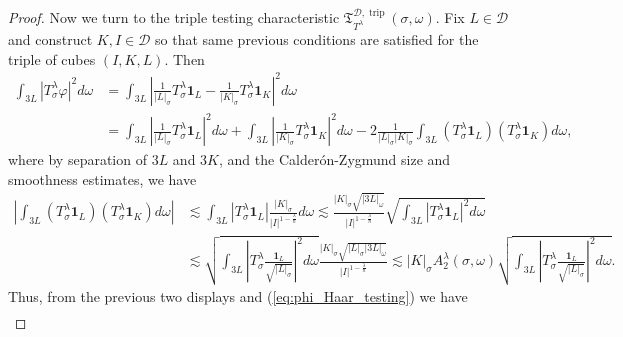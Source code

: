 \documentclass{amsart}%
\theoremstyle{plain}
\numberwithin{equation}{section}
\begin{document}
\begin{proof}
Now we turn to the triple testing characteristic $\mathfrak{T}_{T^{\lambda}%
}^{\mathcal{D},\operatorname*{trip}}\left(  \sigma,\omega\right)  $. Fix
$L\in\mathcal{D}$ and construct $K,I\in\mathcal{D}$ so that same previous conditions are satisfied for the triple of cubes $\left(  I,K,L\right)  $. Then 
\begin{align*}
\int_{3L}\left\vert T_{\sigma}^{\lambda}\varphi\right\vert ^{2}d\omega &
=\int_{3L}\left\vert \frac{1}{\left\vert L\right\vert _{\sigma}}T_{\sigma
}^{\lambda}\mathbf{1}_{L}-\frac{1}{\left\vert K\right\vert _{\sigma}}%
T_{\sigma}^{\lambda}\mathbf{1}_{K}\right\vert ^{2}d\omega\\
&  =\int_{3L}\left\vert \frac{1}{\left\vert L\right\vert _{\sigma}}T_{\sigma
}^{\lambda}\mathbf{1}_{L}\right\vert ^{2}d\omega+\int_{3L}\left\vert \frac
{1}{\left\vert K\right\vert _{\sigma}}T_{\sigma}^{\lambda}\mathbf{1}%
_{K}\right\vert ^{2}d\omega-2\frac{1}{\left\vert L\right\vert _{\sigma
}\left\vert K\right\vert _{\sigma}}\int_{3L}\left(  T_{\sigma}^{\lambda
}\mathbf{1}_{L}\right)  \left(  T_{\sigma}^{\lambda}\mathbf{1}_{K}\right)
d\omega,
\end{align*}
where by separation of $3L$ and $3K$, and the Calder\'{o}n-Zygmund size and
smoothness estimates, we have%
\begin{align*}
\left\vert \int_{3L}\left(  T_{\sigma}^{\lambda}\mathbf{1}_{L}\right)  \left(
T_{\sigma}^{\lambda}\mathbf{1}_{K}\right)  d\omega\right\vert  &  \lesssim
\int_{3L}\left\vert T_{\sigma}^{\lambda}\mathbf{1}_{L}\right\vert
\frac{\left\vert K\right\vert _{\sigma}}{\left\vert I\right\vert
^{1-\frac{\lambda}{n}}}d\omega\lesssim\frac{\left\vert K\right\vert _{\sigma
}\sqrt{\left\vert 3L\right\vert _{\omega}}}{\left\vert I\right\vert
^{1-\frac{\lambda}{n}}}\sqrt{\int_{3L}\left\vert T_{\sigma}^{\lambda
}\mathbf{1}_{L}\right\vert ^{2}d\omega}\\
&  \lesssim\sqrt{\int_{3L}\left\vert T_{\sigma}^{\lambda}\frac{\mathbf{1}_{L}%
}{\sqrt{\left\vert L\right\vert _{\sigma}}}\right\vert ^{2}d\omega}%
\frac{\left\vert K\right\vert _{\sigma}\sqrt{\left\vert L\right\vert _{\sigma
}\left\vert 3L\right\vert _{\omega}}}{\left\vert I\right\vert ^{1-\frac
{\lambda}{n}}}\lesssim\left\vert K\right\vert _{\sigma}A_{2}^{\lambda}\left(
\sigma,\omega\right)  \sqrt{\int_{3L}\left\vert T_{\sigma}^{\lambda}%
\frac{\mathbf{1}_{L}}{\sqrt{\left\vert L\right\vert _{\sigma}}}\right\vert
^{2}d\omega}.
\end{align*}
Thus, from the previous two displays and (\ref{eq:phi_Haar_testing}) we have%
\begin{align}

\end{align}
\end{proof}
\end{document}
